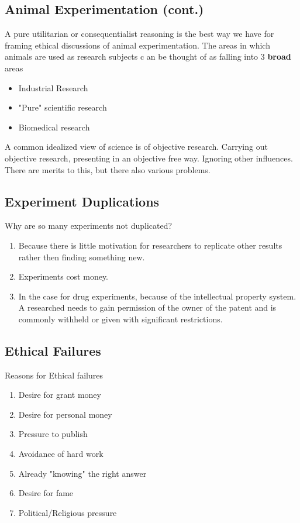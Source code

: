 \documentclass{report}
\theoremstyle{definition}
\theoremstyle{plain}
\theoremstyle{remark}
\begin{document}
\subsection{Animal Experimentation (cont.)}
A pure utilitarian or consequentialist reasoning is the best way we have for
framing ethical discussions of animal experimentation. The areas in which
animals are used as research subjects c an be thought of as falling into
3 \textbf{broad} areas
\begin{itemize}
  \item Industrial Research
  \item "Pure" scientific research
  \item Biomedical research
\end{itemize}
A common idealized view of science is of objective research. Carrying out
objective research, presenting in an objective free way. Ignoring other
influences. There are merits to this, but there also various problems.

\subsection{Experiment Duplications}
Why are so many experiments not duplicated?
\begin{enumerate}
  \item Because there is little motivation for researchers to replicate other
    results rather then finding something new.
  \item Experiments cost money.
  \item In the case for drug experiments, because of the intellectual property
    system. A researched needs to gain permission of the owner of the patent
    and is commonly withheld or given with significant restrictions.
\end{enumerate}

\subsection{Ethical Failures}
Reasons for Ethical failures
\begin{enumerate}
  \item Desire for grant money
  \item Desire for personal money
  \item Pressure to publish
  \item Avoidance of hard work
  \item Already  "knowing" the right answer
  \item Desire for fame
  \item Political/Religious pressure
\end{enumerate}
\end{document}
